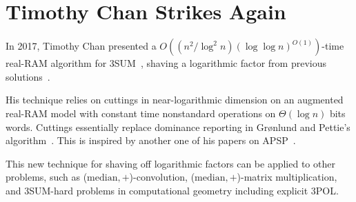 \section{Timothy Chan Strikes Again}

In 2017, Timothy Chan presented a
\(O((n^2 / \log^2 n)(\log \log n)^{O(1)})\)-time real-RAM algorithm for
3SUM~\cite{Ch18}, shaving a logarithmic factor from previous solutions~\cite{Fr15,GS15}.

His technique relies on cuttings in near-logarithmic dimension on an augmented
real-RAM model with constant time nonstandard operations on $\Theta(\log n)$
bits words. Cuttings essentially replace dominance reporting in Gr\o nlund and
Pettie's algorithm~\cite{GP18}.
This is inspired by another one of his papers on APSP~\cite{Cha10}.

This new technique for shaving off logarithmic factors
can be applied to other problems, such as (\(\text{median}, +\))-convolution,
(\(\text{median}, +\))-matrix multiplication, and 3SUM-hard problems in
computational geometry including explicit 3POL.

